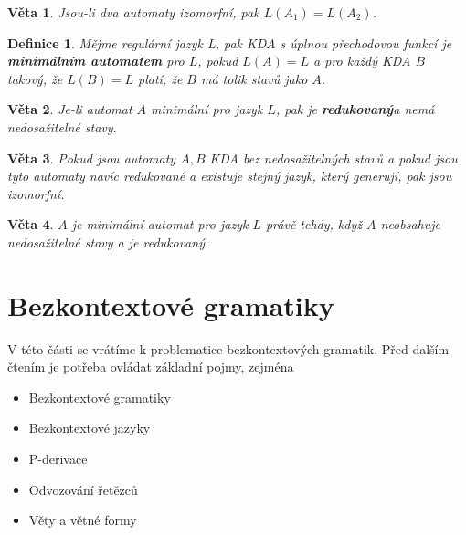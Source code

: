 \documentclass[10pt, a4paper, titlepage]{article}
\theoremstyle{note}
\newtheorem{veta}{Věta}
\newtheorem{definice}{Definice}
\begin{document}
\begin{veta}
Jsou-li dva automaty izomorfní, pak $L(A_1) = L(A_2)$.
\end{veta}

\begin{definice}
Mějme regulární jazyk L, pak KDA s úplnou přechodovou funkcí je \textbf{minimálním automatem} pro $L$,
pokud $L(A) = L$ a pro každý KDA $B$ takový, že $L(B) = L$ platí, že $B$ má tolik stavů jako $A$.
\end{definice}

\begin{veta}
Je-li automat $A$ minimální pro jazyk $L$, pak je \textbf{redukovaný}a nemá nedosažitelné stavy.
\end{veta}

\begin{veta}
Pokud jsou automaty $A, B$ KDA bez nedosažitelných stavů a pokud jsou tyto automaty navíc redukované a
existuje stejný jazyk, který generují, pak jsou izomorfní.
\end{veta}

\begin{veta}
$A$ je minimální automat pro jazyk $L$ právě tehdy, když $A$ neobsahuje nedosažitelné stavy a je redukovaný.
\end{veta}


\section{Bezkontextové gramatiky}
V této části se vrátíme k problematice bezkontextových gramatik. Před dalším čtením je potřeba ovládat základní pojmy, zejména
\begin{itemize}
\item
Bezkontextové gramatiky
\item
Bezkontextové jazyky
\item
P-derivace
\item
Odvozování řetězců
\item
Věty a větné formy

\end{itemize}
\end{document}
